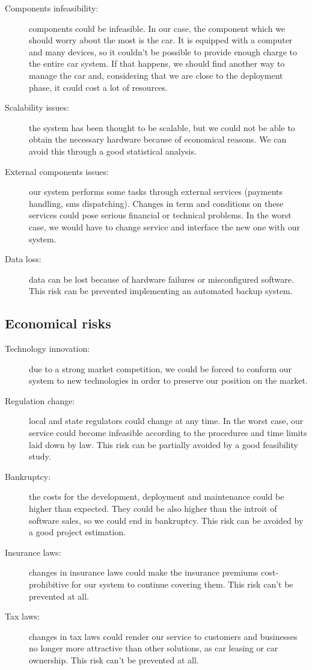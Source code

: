 \begin{description}
	\item [Components infeasibility: ] components could be infeasible. In our case, the component which we should worry about the most is the car. It is equipped with a computer and many devices, so it couldn't be possible to provide enough charge to the entire car system. If that happens, we should find another way to manage the car and, considering that we are close to the deployment phase, it could cost a lot of resources.
	\item [Scalability issues: ] the system has been thought to be scalable, but we could not be able to obtain the necessary hardware because of economical reasons. We can avoid this through a good statistical analysis.
	\item [External components issues:] our system performs some tasks through external services (payments handling, sms dispatching). Changes in term and conditions on these services could pose serious financial or technical problems. In the worst case, we would have to change service and interface the new one with our system.
	\item [Data loss:] data can be lost because of hardware failures or misconfigured software. This risk can be prevented implementing an automated backup system.
\end{description}


\subsection {Economical risks}

\begin{description}
	\item [Technology innovation:] due to a strong market competition, we could be forced to conform our system to new technologies in order to preserve our position on the market.
	\item [Regulation change:] local and state regulators could change at any time. In the worst case, our service could become infeasible according to the procedures and time limits laid down by law. This risk can be partially avoided by a good feasibility study.
	\item [Bankruptcy:] the costs for the development, deployment and maintenance could be higher than expected. They could be also higher than the introit of software sales, so we could end in bankruptcy. This risk can be avoided by a good project estimation.
	\item [Insurance laws:] changes in insurance laws could make the insurance premiums cost-prohibitive for our system to continue covering them. This risk can't be prevented at all.
	\item [Tax laws:] changes in tax laws could render our service to customers and businesses no longer more attractive than other solutions, as car leasing or car ownership. This risk can't be prevented at all.
\end{description}